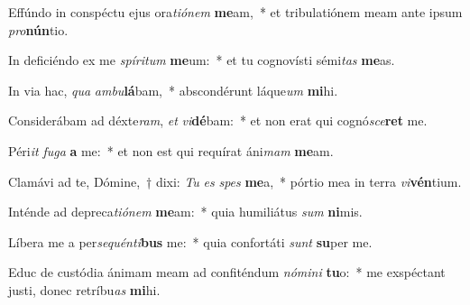 \item Effúndo in conspéctu ejus ora\textit{ti}\textit{ó}\textit{nem} \textbf{me}am,~* et tribulatiónem meam ante ipsum \textit{pro}\textbf{nún}tio.
\item In deficiéndo ex me \textit{spí}\textit{ri}\textit{tum} \textbf{me}um:~* et tu cognovísti sémi\textit{tas} \textbf{me}as.
\item In via hac, \textit{qua} \textit{am}\textit{bu}\textbf{lá}bam,~* abscondérunt láque\textit{um} \textbf{mi}hi.
\item Considerábam ad déxte\textit{ram}, \textit{et} \textit{vi}\textbf{dé}bam:~* et non erat qui cognó\textit{sce}\textbf{ret} me.
\item Péri\textit{it} \textit{fu}\textit{ga} \textbf{a} me:~* et non est qui requírat áni\textit{mam} \textbf{me}am.
\item Clamávi ad te, Dómine,~† dixi: \textit{Tu} \textit{es} \textit{spes} \textbf{me}a,~* pórtio mea in terra \textit{vi}\textbf{vén}tium.
\item Inténde ad depreca\textit{ti}\textit{ó}\textit{nem} \textbf{me}am:~* quia humiliátus \textit{sum} \textbf{ni}mis.
\item Líbera me a per\textit{se}\textit{quén}\textit{ti}\textbf{bus} me:~* quia confortáti \textit{sunt} \textbf{su}per me.
\item Educ de custódia ánimam meam ad confiténdum \textit{nó}\textit{mi}\textit{ni} \textbf{tu}o:~* me exspéctant justi, donec retríbu\textit{as} \textbf{mi}hi.
